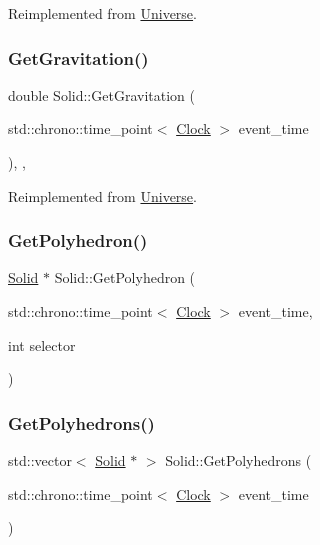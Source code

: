 Reimplemented from \mbox{\hyperlink{classUniverse_a9f099605c082e7fa755787a6a8cab7ba}{Universe}}.

\mbox{\label{classSolid_ab5ecb5598be93fe3cd2a21c0cfd363c8}} 
\subsubsection{\texorpdfstring{Get\+Gravitation()}{GetGravitation()}}
{\footnotesize\ttfamily double Solid\+::\+Get\+Gravitation (\begin{DoxyParamCaption}\item[{std\+::chrono\+::time\+\_\+point$<$ \mbox{\hyperlink{universe_8h_a0ef8d951d1ca5ab3cfaf7ab4c7a6fd80}{Clock}} $>$}]{event\+\_\+time }\end{DoxyParamCaption})\hspace{0.3cm}{\ttfamily [inline]}, {\ttfamily [final]}, {\ttfamily [virtual]}}



Reimplemented from \mbox{\hyperlink{classUniverse_ab0404e774ee0ed66b597ff5b8e989446}{Universe}}.

\mbox{\label{classSolid_a256ecadf461f7232eb05c28b6b4b438a}} 
\subsubsection{\texorpdfstring{Get\+Polyhedron()}{GetPolyhedron()}}
{\footnotesize\ttfamily \mbox{\hyperlink{classSolid}{Solid}} $\ast$ Solid\+::\+Get\+Polyhedron (\begin{DoxyParamCaption}\item[{std\+::chrono\+::time\+\_\+point$<$ \mbox{\hyperlink{universe_8h_a0ef8d951d1ca5ab3cfaf7ab4c7a6fd80}{Clock}} $>$}]{event\+\_\+time,  }\item[{int}]{selector }\end{DoxyParamCaption})}

\mbox{\label{classSolid_a7006714c19bf8a7b020f42f394e4edc0}} 
\subsubsection{\texorpdfstring{Get\+Polyhedrons()}{GetPolyhedrons()}}
{\footnotesize\ttfamily std\+::vector$<$ \mbox{\hyperlink{classSolid}{Solid}} $\ast$ $>$ Solid\+::\+Get\+Polyhedrons (\begin{DoxyParamCaption}\item[{std\+::chrono\+::time\+\_\+point$<$ \mbox{\hyperlink{universe_8h_a0ef8d951d1ca5ab3cfaf7ab4c7a6fd80}{Clock}} $>$}]{event\+\_\+time }\end{DoxyParamCaption})}

